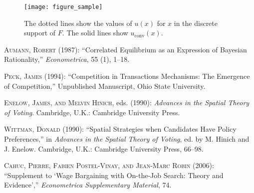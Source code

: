 \documentclass[te,nameyear,final,supplement]{econsocart}
\theoremstyle{plain}
\theoremstyle{definition}
\begin{document}
\begin{figure}
\texttt{[image: figure\_sample]}
\caption{The dotted lines show the values of
$u(x)$ for $x$ in the discrete support of $F$. The solid lines show $u_\textrm{conv}(x)$.}
\label{penG}
\end{figure}




\begin{thebibliography}{}
%
\textsc{Aumann, Robert} (1987):
``Correlated Equilibrium as an Expression of Bayesian Rationality,''
\textit{Econometrica}, 55 (1), 1--18.
\endbibitem

\textsc{Peck, James} (1994):
``Competition in Transactions Mechanisms: The Emergence of Competition,''
Unpublished Manuscript, Ohio State University.
\endbibitem

\textsc{Enelow, James, and Melvin Hinich}, eds. (1990):
\textit{Advances in the Spatial Theory of Voting}.
Cambridge, U.K.: Cambridge University Press.
\endbibitem

\textsc{Wittman, Donald} (1990):
``Spatial Strategies when Candidates Have Policy Preferences,''
in \textit{Advances in the Spatial Theory of Voting},
ed. by M. Hinich and J. Enelow.
Cambridge, U.K.: Cambridge University Press, 66--98.
\endbibitem

\textsc{Cahuc, Pierre, Fabien Postel-Vinay, and Jean-Marc Robin} (2006): ``Supplement to `Wage Bargaining with On-the-Job Search: Theory and Evidence',''
\textit{Econometrica Supplementary Material}, 74.
\endbibitem
\end{thebibliography}
\end{document}
